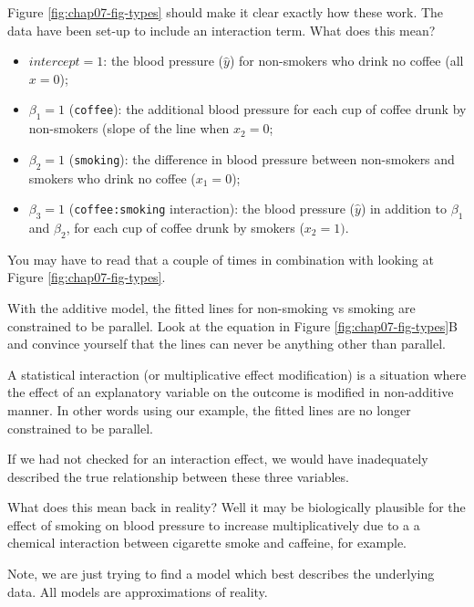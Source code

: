 \documentclass[12pt,]{krantz}
\providecommand{\tightlist}{%
  \setlength{\itemsep}{0pt}\setlength{\parskip}{0pt}}
\theoremstyle{definition}
\theoremstyle{definition}
\theoremstyle{definition}
\theoremstyle{remark}
\begin{document}
Figure \ref{fig:chap07-fig-types} should make it clear exactly how these
work. The data have been set-up to include an interaction term. What
does this mean?

\begin{itemize}
\tightlist
\item
  \(intercept=1\): the blood pressure (\(\hat{y}\)) for non-smokers who
  drink no coffee (all \(x=0\));
\item
  \(\beta_1=1\) (\texttt{coffee}): the additional blood pressure for
  each cup of coffee drunk by non-smokers (slope of the line when
  \(x_2=0\);
\item
  \(\beta_2=1\) (\texttt{smoking}): the difference in blood pressure
  between non-smokers and smokers who drink no coffee (\(x_1=0\));
\item
  \(\beta_3=1\) (\texttt{coffee:smoking} interaction): the blood
  pressure (\(\hat{y}\)) in addition to \(\beta_1\) and \(\beta_2\), for
  each cup of coffee drunk by smokers (\(x_2=1)\).
\end{itemize}

You may have to read that a couple of times in combination with looking
at Figure \ref{fig:chap07-fig-types}.

With the additive model, the fitted lines for non-smoking vs smoking are
constrained to be parallel. Look at the equation in Figure
\ref{fig:chap07-fig-types}B and convince yourself that the lines can
never be anything other than parallel.

A statistical interaction (or multiplicative effect modification) is a
situation where the effect of an explanatory variable on the outcome is
modified in non-additive manner. In other words using our example, the
fitted lines are no longer constrained to be parallel.

If we had not checked for an interaction effect, we would have
inadequately described the true relationship between these three
variables.

What does this mean back in reality? Well it may be biologically
plausible for the effect of smoking on blood pressure to increase
multiplicatively due to a a chemical interaction between cigarette smoke
and caffeine, for example.

Note, we are just trying to find a model which best describes the
underlying data. All models are approximations of reality.
\end{document}
